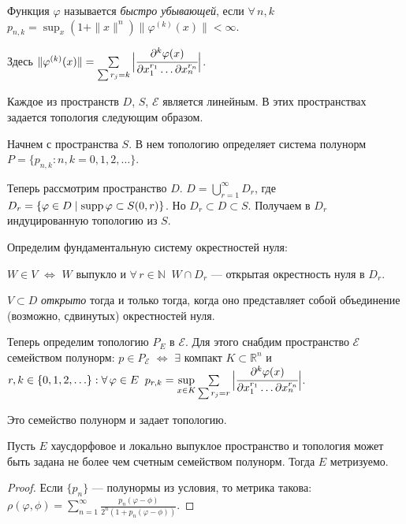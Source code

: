 \documentclass[12pt,titlepage, a4paper]{article}
\begin{document}
\begin{defen}
Функция $\varphi$ называется \emph{быстро убывающей}, если
$\forall\,
n,k$\;\;$p_{n,k}=\sup_x(1+\|x\|^n)\|\varphi^{(k)}(x)\|<\infty$.
\end{defen}

\begin{defen}
Здесь $\|\varphi^{(k)}(x)\|=\sum\limits_{\sum
r_j=k}\Big|\cfrac{\partial^k\varphi(x)}{\partial x^{r_1}_{1 } \ldots
\partial  x^{r_n}_{n }}\Big|$.
\end{defen}

Каждое из пространств $D$, $S$, $\mathcal{E}$ является линейным. В
этих пространствах задается топология следующим образом.

Начнем с пространства $S$. В нем топологию определяет система
полунорм $P=\{p_{n,k}: n,k=0,1,2,\ldots\}$.

Теперь рассмотрим пространство $D$.
$D=\bigcup\limits_{r=1}^{\infty}D_r$, где $D_{r}=\{\varphi\in D\mid
\mathop{\mathrm{supp}} \varphi\subset S(0,r)\}$. Но $D_r \subset D\subset S$.
Получаем в $D_r$ индуцированную топологию из $S$.

Определим фундаментальную систему окрестностей нуля:

$W\in V$ $\Leftrightarrow$ $W$ выпукло и $\forall\, r\in
\mathbb{N}\;\; W\cap D_r$ --- открытая окрестность нуля в $D_r$.

\begin{defen}
$V\subset D$ \emph{открыто} тогда и только тогда, когда оно
представляет собой объединение (возможно, сдвинутых) окрестностей
нуля.
\end{defen}

Теперь определим топологию $P_E$ в $\mathcal{E}$. Для этого снабдим
пространство $\mathcal{E}$ семейством полунорм: $p\in P_\mathcal{E}$
$\Leftrightarrow$ $\exists$ компакт $K\subset \mathbb{R}^n$ и
$r,k\p\in \{0,1,2,\ldots\}: \forall\, \varphi \in E\;\;
p_{r,k}=\sup\limits_{x\in K}\sum\limits_{\sum
r_j=r}\Big|\cfrac{\partial^k\varphi(x)}{\partial x^{r_1}_{1 } \ldots
\partial  x^{r_n}_{n }}\Big|$.

Это семейство полунорм и задает топологию.

\begin{theorem}
Пусть $E$ хаусдорфовое и локально выпуклое пространство и топология
может быть задана не более чем счетным семейством полунорм. Тогда
$E$ метризуемо.
\end{theorem}

\begin{proof}
Если $\{p_n\}$ --- полунормы из условия, то метрика такова:
$\rho(\varphi,\phi)=\sum_{n=1}^{\infty}\frac{p_n(\varphi-\phi)}{2^n(1+p_n(\varphi-\phi))}$.
\end{proof}
\end{document}
